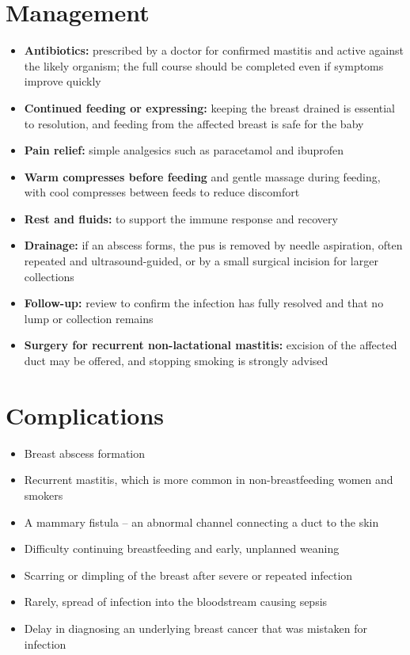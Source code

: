 \section*{Management}
\begin{itemize}
    \item \textbf{Antibiotics:} prescribed by a doctor for confirmed mastitis and active against the likely organism; the full course should be completed even if symptoms improve quickly
    \item \textbf{Continued feeding or expressing:} keeping the breast drained is essential to resolution, and feeding from the affected breast is safe for the baby
    \item \textbf{Pain relief:} simple analgesics such as paracetamol and ibuprofen
    \item \textbf{Warm compresses before feeding} and gentle massage during feeding, with cool compresses between feeds to reduce discomfort
    \item \textbf{Rest and fluids:} to support the immune response and recovery
    \item \textbf{Drainage:} if an abscess forms, the pus is removed by needle aspiration, often repeated and ultrasound-guided, or by a small surgical incision for larger collections
    \item \textbf{Follow-up:} review to confirm the infection has fully resolved and that no lump or collection remains
    \item \textbf{Surgery for recurrent non-lactational mastitis:} excision of the affected duct may be offered, and stopping smoking is strongly advised
\end{itemize}

\section*{Complications}
\begin{itemize}
    \item Breast abscess formation
    \item Recurrent mastitis, which is more common in non-breastfeeding women and smokers
    \item A mammary fistula -- an abnormal channel connecting a duct to the skin
    \item Difficulty continuing breastfeeding and early, unplanned weaning
    \item Scarring or dimpling of the breast after severe or repeated infection
    \item Rarely, spread of infection into the bloodstream causing sepsis
    \item Delay in diagnosing an underlying breast cancer that was mistaken for infection
\end{itemize}

